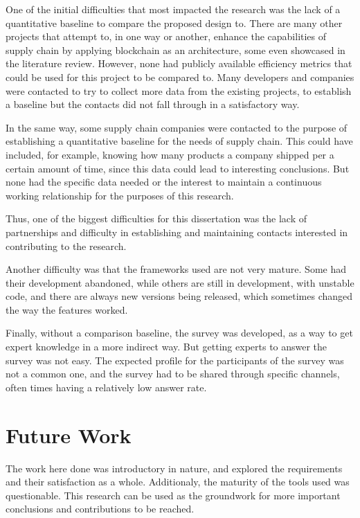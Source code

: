 One of the initial difficulties that most impacted the research was the lack of a quantitative baseline to compare the proposed design to. There are many other projects that attempt to, in one way or another, enhance the capabilities of supply chain by applying blockchain as an architecture, some even showcased in the literature review. However, none had publicly available efficiency metrics that could be used for this project to be compared to. Many developers and companies were contacted to try to collect more data from the existing projects, to establish a baseline but the contacts did not fall through in a satisfactory way. 

In the same way, some supply chain companies were contacted to the purpose of establishing a quantitative baseline for the needs of supply chain. This could have included, for example, knowing how many products a company shipped per a certain amount of time, since this data could lead to interesting conclusions. But none had the specific data needed or the interest to maintain a continuous working relationship for the purposes of this research.

Thus, one of the biggest difficulties for this dissertation was the lack of partnerships and difficulty in establishing and maintaining contacts interested in contributing to the research. %

Another difficulty was that the frameworks used are not very mature. Some had their development abandoned, while others are still in development, with unstable code, and there are always new versions being released, which sometimes changed the way the features worked.

Finally, without a comparison baseline, the survey was developed, as a way to get expert knowledge in a more indirect way. But getting experts to answer the survey was not easy. The expected profile for the participants of the survey was not a common one, and the survey had to be shared through specific channels, often times having a relatively low answer rate.

\section{Future Work}

The work here done was introductory in nature, and explored the requirements and their satisfaction as a whole. Additionaly, the maturity of the tools used was questionable. This research can be used as the groundwork for more important conclusions and contributions to be reached.

